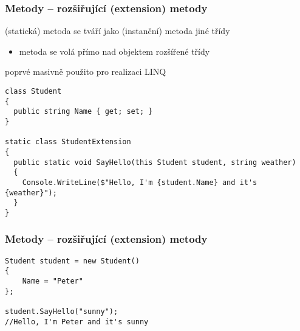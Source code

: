 \begin{frame}[fragile]
\frametitle{Metody -- rozšiřující (extension) metody}

\begin{bitemize}{}
\item (statická) metoda se tváří jako (instanční) metoda jiné třídy
\begin{itemize}
\item metoda se volá přímo nad objektem rozšířené třídy
\end{itemize}

\item poprvé masivně použito pro realizaci LINQ
\end{bitemize}
\vfill
\begin{yesblock}
\begin{lstlisting}[basicstyle=\small]
class Student
{
  public string Name { get; set; }
}

static class StudentExtension
{
  public static void SayHello(this Student student, string weather)
  {
    Console.WriteLine($"Hello, I'm {student.Name} and it's {weather}");
  }
}
\end{lstlisting}
\end{yesblock}
\end{frame}

\begin{frame}[fragile]
\frametitle{Metody -- rozšiřující (extension) metody}
\begin{yesblock}
\begin{lstlisting}[basicstyle=\small]
Student student = new Student()
{
    Name = "Peter"
};

student.SayHello("sunny");
//Hello, I'm Peter and it's sunny
\end{lstlisting}
\end{yesblock}
\end{frame}


\zkouskove